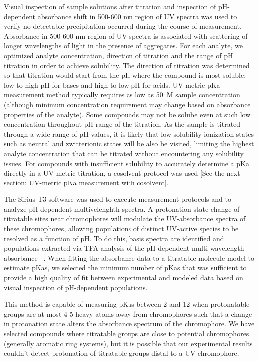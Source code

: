 \documentclass[9pt,lineno]{elife}
\begin{document}
Visual inspection of sample solutions after titration and inspection of pH-dependent absorbance shift in 500-600 nm region of UV spectra was used to verify no detectable precipitation occurred during the course of measurement. Absorbance in 500-600 nm region of UV spectra is associated with scattering of longer wavelengths of light in the presence of aggregates. For each analyte, we optimized analyte concentration, direction of titration and the range of pH titration in order to achieve solubility. The direction of titration was determined so that titration would start from the pH where the compound is most soluble: low-to-high pH for bases and high-to-low pH for acids. UV-metric pKa measurement method typically requires as low as 50~\micro M sample concentration (although minimum concentration requirement may change based on absorbance properties of the analyte). Some compounds may not be solube even at such low concentration throughout pH range of the titration. As the sample is titrated through a wide range of pH values, it is likely that low solubility ionization states such as neutral and zwitterionic states will be also be visited, limiting the highest analyte concentration that can be titrated without encountering any solubility issues.  For compounds with insufficient solubility to accurately determine a pKa directly in a UV-metric titration, a cosolvent protocol was used [See the next section: UV-metric pKa measurement with cosolvent]. 

The Sirius T3 software  was used to execute measurement protocols and to analyze pH-dependent multivelenghth spectra.
A protonation state change of titratable sites near chromophores will modulate the UV-absorbance spectra of these chromophores, allowing populations of distinct UV-active species to be resolved as a function of pH. To do this, basis spectra are identified and populations extracted via TFA analysis of the pH-dependent multi-wavelength absorbance ~\citep{allen_multiwavelength_1998}. When fitting the absorbance data to a titratable molecule model to estimate pKas, we selected the minimum number of pKas that was sufficient to provide a high quality of fit between experimental and modeled data based on visual inspection of pH-dependent populations.

This method is capable of measuring pKas between 2 and 12 when protonatable groups are at most 4-5 heavy atoms away from chromophores such that a change in protonation state alters the absorbance spectrum of the chromophore. We have selected compounds where titratable groups are close to potential chromophores (generally aromatic ring systems), but it is possible that our experimental results couldn't detect protonation of titratable groups distal to a UV-chromophore.
\end{document}
